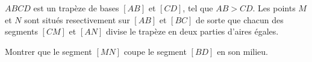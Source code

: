 \documentclass[varwidth]{standalone}
\begin{document}
    $ABCD$ est un trap\`eze de bases $[AB]$ et $[CD]$, tel que $AB > CD$. Les points $M$ et $N$ sont situ\'es resectivement sur $[AB]$ et $[BC]$ de sorte que chacun des segments $[CM]$ et $[AN]$ divise le trap\`eze en deux parties d'aires \'egales.

    Montrer que le segment $[MN]$ coupe le segment $[BD]$ en son milieu.
\end{document}
